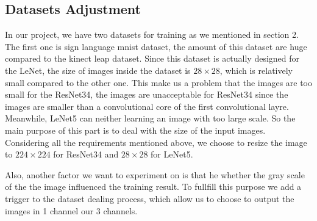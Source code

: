\documentclass[12pt]{article}
\begin{document}
\subsection{Datasets Adjustment}
In our project, we have two datasets for training as we mentioned in section 2. The first one is sign language mnist dataset, the amount of this dataset are huge compared to the kinect leap dataset. Since this dataset is actually designed for the LeNet, the size of images inside the dataset is $28\times 28$, which is relatively small compared to the other one. This make us a problem that the images are too small for the ResNet34, the images are unacceptable for ResNet34 since the images are smaller than a convolutional core of the first convolutional layre. Meanwhile, LeNet5 can neither learning an image with too large scale. So the main purpose of this part is to deal with the size of the input images. Considering all the requirements mentioned above, we choose to resize the image to $224 \times 224$ for ResNet34 and $28\times 28$ for LeNet5.

Also, another factor we want to experiment on is that he whether the gray scale of the the image influenced the training result. To fullfill this purpose we add a trigger to the dataset dealing process, which allow us to choose to output the images in 1 channel our 3 channels. 
\end{document}
